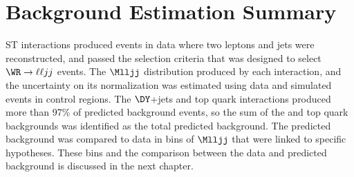 \section{Background Estimation Summary}
ST interactions produced events in data where two leptons and jets were reconstructed, and passed the selection criteria that was 
designed to select $\WR \rightarrow \ell\ell jj$ events.  The $\Mlljj$ distribution produced by each interaction, and the uncertainty on 
its normalization was estimated using data and simulated events in control regions.  The $\DY$+jets and top quark interactions produced 
more than 97\% of predicted background events, so the sum of the \DY and top quark backgrounds was identified as the total predicted 
background.  The predicted background was compared to data in bins of $\Mlljj$ that were linked to specific \mWR hypotheses.  These bins 
and the comparison between the data and predicted background is discussed in the next chapter.


